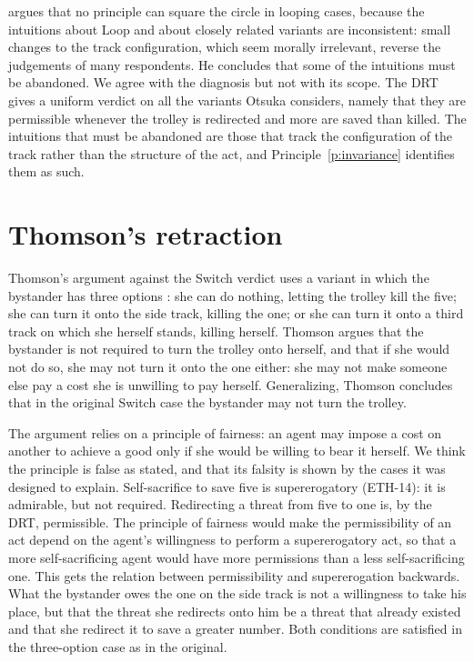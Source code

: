 \documentclass{situationist-preprint}
\begin{document}
\citet{Otsuka2008} argues that no principle can square the circle in looping cases, because the intuitions about Loop and about closely related variants are inconsistent: small changes to the track configuration, which seem morally irrelevant, reverse the judgements of many respondents. He concludes that some of the intuitions must be abandoned. We agree with the diagnosis but not with its scope. The DRT gives a uniform verdict on all the variants Otsuka considers, namely that they are permissible whenever the trolley is redirected and more are saved than killed. The intuitions that must be abandoned are those that track the configuration of the track rather than the structure of the act, and Principle~\ref{p:invariance} identifies them as such.

\section{Thomson's retraction}

Thomson's argument against the Switch verdict uses a variant in which the bystander has three options \citep{Thomson2008}: she can do nothing, letting the trolley kill the five; she can turn it onto the side track, killing the one; or she can turn it onto a third track on which she herself stands, killing herself. Thomson argues that the bystander is not required to turn the trolley onto herself, and that if she would not do so, she may not turn it onto the one either: she may not make someone else pay a cost she is unwilling to pay herself. Generalizing, Thomson concludes that in the original Switch case the bystander may not turn the trolley.

The argument relies on a principle of fairness: an agent may impose a cost on another to achieve a good only if she would be willing to bear it herself. We think the principle is false as stated, and that its falsity is shown by the cases it was designed to explain. Self-sacrifice to save five is supererogatory (ETH-14): it is admirable, but not required. Redirecting a threat from five to one is, by the DRT, permissible. The principle of fairness would make the permissibility of an act depend on the agent's willingness to perform a supererogatory act, so that a more self-sacrificing agent would have more permissions than a less self-sacrificing one. This gets the relation between permissibility and supererogation backwards. What the bystander owes the one on the side track is not a willingness to take his place, but that the threat she redirects onto him be a threat that already existed and that she redirect it to save a greater number. Both conditions are satisfied in the three-option case as in the original.
\end{document}
